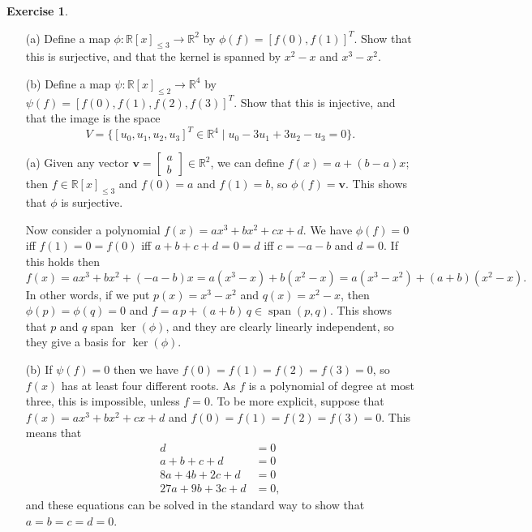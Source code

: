 \documentclass{amsart}
\newcommand{\R}         {{\mathbb{R}}}
\newcommand{\spn}       {\operatorname{span}}
\newcommand{\bsm}       {\left[\begin{smallmatrix}}
\newcommand{\esm}       {\end{smallmatrix}\right]}
\newcommand{\st}        {\;|\;}
\newcommand{\vv}        {\mathbf{v}}
\renewcommand{\:}       {\colon}
\theoremstyle{definition}
\newtheorem{exercise}{Exercise}[section]
\renewenvironment{solution}{\SolutionAtEnd}{\endSolutionAtEnd}
\begin{document}
\begin{exercise}
 \begin{itemize}
  \item[(a)] Define a map $\phi\:\R[x]_{\leq 3}\to\R^2$ by
  $\phi(f)=[f(0),f(1)]^T$.  Show that this is surjective, and that
  the kernel is spanned by $x^2-x$ and $x^3-x^2$.
  \item[(b)] Define a map $\psi\:\R[x]_{\leq 2}\to\R^4$ by
  $\psi(f)=[f(0),f(1),f(2),f(3)]^T$.  Show that this is injective,
  and that the image is the space
  \[ V = \{[u_0,u_1,u_2,u_3]^T\in\R^4\st u_0-3u_1+3u_2-u_3=0\}. \]
 \end{itemize}
\end{exercise}
\begin{solution}
 \begin{itemize}
  \item[(a)] Given any vector $\vv=\bsm a\\ b\esm\in\R^2$,
   we can define $f(x)=a+(b-a)x$; then $f\in\R[x]_{\leq 3}$
   and $f(0)=a$ and $f(1)=b$, so $\phi(f)=\vv$.  This shows
   that $\phi$ is surjective.

   Now consider a polynomial $f(x)=ax^3+bx^2+cx+d$.
   We have $\phi(f)=0$ iff $f(1)=0=f(0)$ iff $a+b+c+d=0=d$
   iff $c=-a-b$ and $d=0$.  If this holds then 
   \[ f(x) = ax^3 + bx^2 + (-a-b)x = a(x^3-x) + b(x^2-x) 
       = a(x^3-x^2) + (a+b)(x^2-x).
   \]
   In other words, if we put $p(x)=x^3-x^2$ and
   $q(x)=x^2-x$, then $\phi(p)=\phi(q)=0$ and
   $f=a\,p+(a+b)\,q\in\spn(p,q)$.  This shows that $p$ and
   $q$ span $\ker(\phi)$, and they are clearly linearly
   independent, so they give a basis for $\ker(\phi)$.
  \item[(b)] If $\psi(f)=0$ then we have
   $f(0)=f(1)=f(2)=f(3)=0$, so $f(x)$ has at least four
   different roots.  As $f$ is a polynomial of degree at
   most three, this is impossible, unless $f=0$.  To be more
   explicit, suppose that $f(x)=ax^3+bx^2+cx+d$ and
   $f(0)=f(1)=f(2)=f(3)=0$.  This means that
   \begin{align*}
    d &= 0 \\
    a+b+c+d &= 0 \\
    8a+4b+2c+d &= 0 \\
    27a+9b+3c+d &= 0,
   \end{align*}
   and these equations can be solved in the standard way to
   show that $a=b=c=d=0$.
 \end{itemize}
\end{solution}
\end{document}
